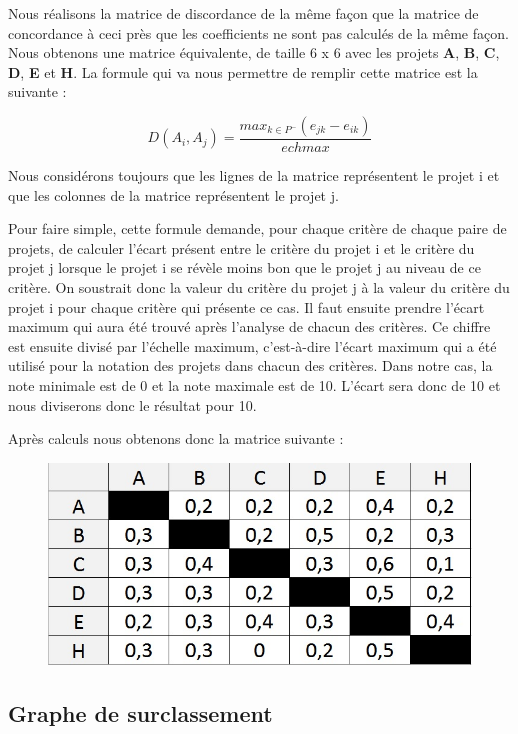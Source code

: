 \documentclass[a4paper,10pt]{article}
\begin{document}
Nous réalisons la matrice de discordance de la même façon que la matrice de concordance à ceci près que les coefficients ne sont pas calculés de la même façon. Nous obtenons une matrice équivalente, de taille 6 x 6 avec les projets \textbf{A}, \textbf{B}, \textbf{C}, \textbf{D}, \textbf{E} et \textbf{H}. La formule qui va nous permettre de remplir cette matrice est la suivante :

\[
  D(A_i, A_j) = \frac{max_{k \in P^-}(e_{jk} - e_{ik})}{echmax}
\]

Nous considérons toujours que les lignes de la matrice représentent le projet i et que les colonnes de la matrice représentent le projet j.

Pour faire simple, cette formule demande, pour chaque critère de chaque paire de projets, de calculer l'écart présent entre le critère du projet i et le critère du projet j lorsque le projet i se révèle moins bon que le projet j au niveau de ce critère. On soustrait donc la valeur du critère du projet j à la valeur du critère du projet i pour chaque critère qui présente ce cas. Il faut ensuite prendre l'écart maximum qui aura été trouvé après l'analyse de chacun des critères. Ce chiffre est ensuite divisé par l'échelle maximum, c'est-à-dire l'écart maximum qui a été utilisé pour la notation des projets dans chacun des critères. Dans notre cas, la note minimale est de 0 et la note maximale est de 10. L'écart sera donc de 10 et nous diviserons donc le résultat pour 10. 

Après calculs nous obtenons donc la matrice suivante :

\begin{figure}[h]
\begin{center}
\includegraphics[scale=0.3]{img/AD-Discordance.jpg}
\end{center}
\end{figure}

\subsection{Graphe de surclassement}
\end{document}
